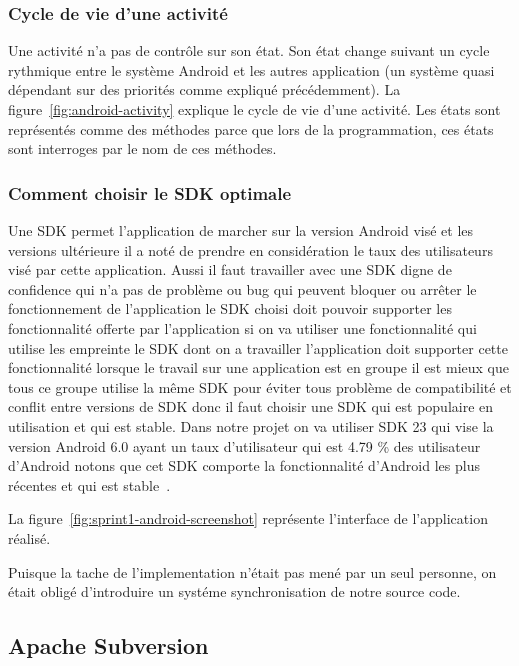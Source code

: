 \subsubsection{Cycle de vie d'une activité}

Une activité n'a pas de contrôle sur son état. Son état change suivant un cycle
rythmique entre le système Android et les autres application (un système quasi
dépendant sur des priorités comme expliqué précédemment). La
figure~\ref{fig:android-activity} explique le cycle de vie d'une activité. Les
états sont représentés comme des méthodes parce que lors de la programmation,
ces états sont interroges par le nom de ces méthodes.



\subsubsection{Comment choisir le SDK optimale}

Une SDK permet l'application de marcher sur la version Android visé et les
versions ultérieure il a noté de prendre en considération le taux des
utilisateurs visé par cette application. Aussi il faut travailler avec une SDK
digne de confidence qui n'a pas de problème ou bug qui peuvent bloquer ou
arrêter le fonctionnement de l'application le SDK choisi doit pouvoir supporter
les fonctionnalité offerte par l'application si on va utiliser une
fonctionnalité qui utilise les empreinte le SDK dont on a travailler
l'application doit supporter cette fonctionnalité lorsque le travail sur une
application est en groupe il est mieux que tous ce groupe utilise la même SDK
pour éviter tous problème de compatibilité et conflit entre versions de SDK
donc il faut choisir une SDK qui est populaire en utilisation et qui est
stable. Dans notre projet on va utiliser SDK 23 qui vise la version Android 6.0
ayant un taux d'utilisateur qui est 4.79 \% des utilisateur d'Android notons que
cet SDK comporte la fonctionnalité d'Android les plus récentes et qui est
stable~\cite{android-sdk}.

La figure~\ref{fig:sprint1-android-screenshot} représente l'interface de
l'application réalisé.

Puisque la tache de l'implementation n'était pas mené par un seul personne, on
était obligé d'introduire un systéme synchronisation de notre source code.

\subsection{Apache Subversion}

